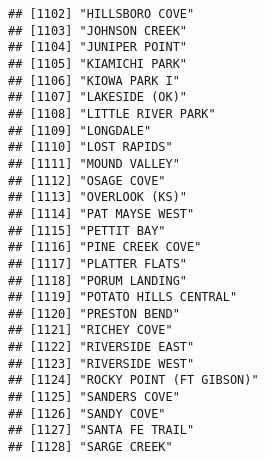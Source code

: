 \documentclass[
]{article}
\begin{document}
\begin{verbatim}
## [1102] "HILLSBORO COVE"                                                                      
## [1103] "JOHNSON CREEK"                                                                       
## [1104] "JUNIPER POINT"                                                                       
## [1105] "KIAMICHI PARK"                                                                       
## [1106] "KIOWA PARK I"                                                                        
## [1107] "LAKESIDE (OK)"                                                                       
## [1108] "LITTLE RIVER PARK"                                                                   
## [1109] "LONGDALE"                                                                            
## [1110] "LOST RAPIDS"                                                                         
## [1111] "MOUND VALLEY"                                                                        
## [1112] "OSAGE COVE"                                                                          
## [1113] "OVERLOOK (KS)"                                                                       
## [1114] "PAT MAYSE WEST"                                                                      
## [1115] "PETTIT BAY"                                                                          
## [1116] "PINE CREEK COVE"                                                                     
## [1117] "PLATTER FLATS"                                                                       
## [1118] "PORUM LANDING"                                                                       
## [1119] "POTATO HILLS CENTRAL"                                                                
## [1120] "PRESTON BEND"                                                                        
## [1121] "RICHEY COVE"                                                                         
## [1122] "RIVERSIDE EAST"                                                                      
## [1123] "RIVERSIDE WEST"                                                                      
## [1124] "ROCKY POINT (FT GIBSON)"                                                             
## [1125] "SANDERS COVE"                                                                        
## [1126] "SANDY COVE"                                                                          
## [1127] "SANTA FE TRAIL"                                                                      
## [1128] "SARGE CREEK"                                                                         

\end{verbatim}
\end{document}
